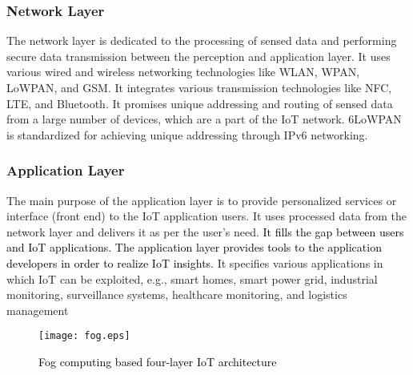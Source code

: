 \documentclass[10pt,journal,sort & compress]{IEEEtran}
\begin{document}
\subsubsection{Network Layer}
The network layer is dedicated to the processing of sensed data and performing secure data transmission between the perception and application layer. It uses various wired and wireless networking technologies like WLAN, WPAN, LoWPAN, and GSM. It integrates various transmission technologies like NFC, LTE, and Bluetooth. It promises unique addressing and routing of sensed data from a large number of devices, which are a part of the IoT network. $ 6 $LoWPAN is standardized for achieving unique addressing through IPv$ 6 $ networking.


\subsubsection{Application Layer}
The main purpose of the application layer is to provide personalized services or interface (front end) to the IoT application users. It uses processed data from the network layer and delivers it as per the user's need. \textcolor{black}{It fills the gap between users and IoT applications. The application layer provides tools to the application developers in order to realize IoT insights.} It specifies various applications in which IoT can be exploited, e.g., smart homes, smart power grid, industrial monitoring, surveillance systems, healthcare monitoring, and logistics management \cite{ IoTCore1,MIORANDI20121497, sethi2017internet}


\begin{figure}[!h]
	\centering
	\texttt{[image: fog.eps]}
	\caption{\textcolor{black}{Fog computing based four-layer IoT architecture}}
	\label{FOA}
\end{figure}
\end{document}
